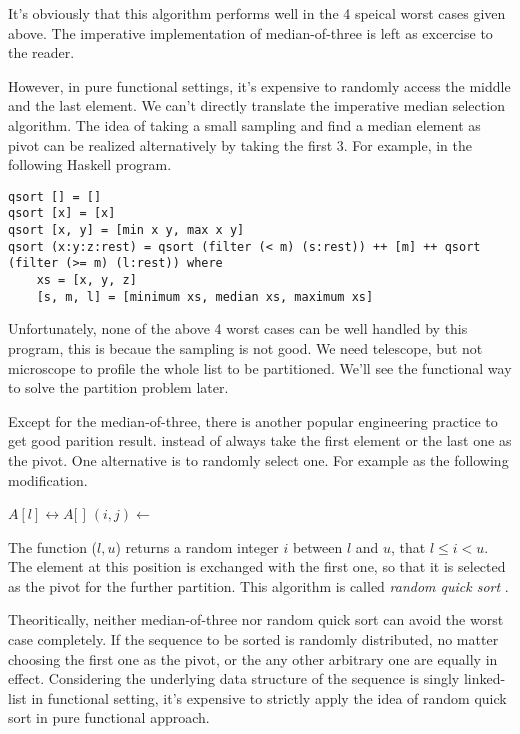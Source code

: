 \documentclass{article}
\begin{document}
It's obviously that this algorithm performs well in the 4 speical worst cases given above.
The imperative implementation of median-of-three is left as excercise to the reader.

However, in pure functional settings, it's expensive to randomly access the middle and the last
element. We can't directly translate the imperative median selection algorithm. The idea of
taking a small sampling and find a median element as pivot can be realized alternatively
by taking the first 3. For example, in the following Haskell program.

\lstset{language=Haskell}
\begin{lstlisting}
qsort [] = []
qsort [x] = [x]
qsort [x, y] = [min x y, max x y]
qsort (x:y:z:rest) = qsort (filter (< m) (s:rest)) ++ [m] ++ qsort (filter (>= m) (l:rest)) where
    xs = [x, y, z]
    [s, m, l] = [minimum xs, median xs, maximum xs]  
\end{lstlisting}

Unfortunately, none of the above 4 worst cases can be well handled by this program, this is becaue
the sampling is not good. We need telescope, but not microscope to profile the whole list to be
partitioned. We'll see the functional way to solve the partition problem later.

Except for the median-of-three, there is another popular engineering practice to get good parition
result. instead of always take the first element or the last one as the pivot. One alternative is
to randomly select one. For example as the following modification.

\begin{algorithmic}
    \State {} $A[l] \leftrightarrow A[$  $]$
    \State $(i, j) \gets $ 
    \State {}
    \State {}
  \EndIf
\EndProcedure
\end{algorithmic}

The function ($l, u$) returns a random integer $i$ between $l$ and $u$, that
$l \leq i < u$. The element at this position is exchanged with the first one, so that it is
selected as the pivot for the further partition. This algorithm is called {\em random quick sort} \cite{CLRS}.

Theoritically, neither median-of-three nor random quick sort can avoid the worst case completely.
If the sequence to be sorted is randomly distributed, no matter choosing the first one as the
pivot, or the any other arbitrary one are equally in effect. Considering the underlying data
structure of the sequence is singly linked-list in functional setting, it's expensive to
strictly apply the idea of random quick sort in pure functional approach.
\end{document}
